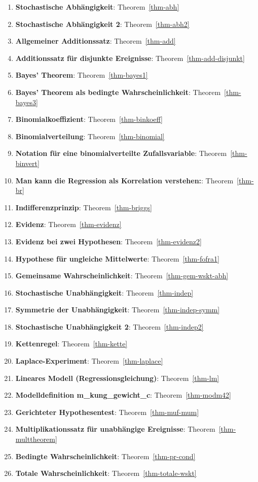 \documentclass[
  ngerman,
  letterpaper,
  twoside,
  open=any]{scrbook}
\theoremstyle{definition}
\theoremstyle{plain}
\theoremstyle{definition}
\theoremstyle{definition}
\theoremstyle{definition}
\theoremstyle{definition}
\theoremstyle{remark}
\begin{document}
\begin{enumerate}
\def\labelenumi{\arabic{enumi}.}
\item
  \textbf{Stochastische Abhängigkeit}: Theorem~\ref{thm-abh}
\item
  \textbf{Stochastische Abhängigkeit 2}: Theorem~\ref{thm-abh2}
\item
  \textbf{Allgemeiner Additionssatz}: Theorem~\ref{thm-add}
\item
  \textbf{Additionssatz für disjunkte Ereignisse}:
  Theorem~\ref{thm-add-disjunkt}
\item
  \textbf{Bayes' Theorem}: Theorem~\ref{thm-bayes1}
\item
  \textbf{Bayes' Theorem als bedingte Wahrscheinlichkeit}:
  Theorem~\ref{thm-bayes3}
\item
  \textbf{Binomialkoeffizient}: Theorem~\ref{thm-binkoeff}
\item
  \textbf{Binomialverteilung}: Theorem~\ref{thm-binomial}
\item
  \textbf{Notation für eine binomialverteilte Zufallsvariable}:
  Theorem~\ref{thm-binvert}
\item
  \textbf{Man kann die Regression als Korrelation verstehen:}:
  Theorem~\ref{thm-br}
\item
  \textbf{Indifferenzprinzip}: Theorem~\ref{thm-briggs}
\item
  \textbf{Evidenz}: Theorem~\ref{thm-evidenz}
\item
  \textbf{Evidenz bei zwei Hypothesen}: Theorem~\ref{thm-evidenz2}
\item
  \textbf{Hypothese für ungleiche Mittelwerte}: Theorem~\ref{thm-fofra1}
\item
  \textbf{Gemeinsame Wahrscheinlichkeit}: Theorem~\ref{thm-gem-wskt-abh}
\item
  \textbf{Stochastische Unabhängigkeit}: Theorem~\ref{thm-indep}
\item
  \textbf{Symmetrie der Unabhängigkeit}: Theorem~\ref{thm-indep-symm}
\item
  \textbf{Stochastische Unabhängigkeit 2}: Theorem~\ref{thm-indep2}
\item
  \textbf{Kettenregel}: Theorem~\ref{thm-kette}
\item
  \textbf{Laplace-Experiment}: Theorem~\ref{thm-laplace}
\item
  \textbf{Lineares Modell (Regressionsgleichung)}: Theorem~\ref{thm-lm}
\item
  \textbf{Modelldefinition m\_kung\_gewicht\_c}:
  Theorem~\ref{thm-modm42}
\item
  \textbf{Gerichteter Hypothesentest}: Theorem~\ref{thm-muf-mum}
\item
  \textbf{Multiplikationssatz für unabhängige Ereignisse}:
  Theorem~\ref{thm-multtheorem}
\item
  \textbf{Bedingte Wahrscheinlichkeit}: Theorem~\ref{thm-pr-cond}
\item
  \textbf{Totale Wahrscheinlichkeit}: Theorem~\ref{thm-totale-wskt}
\end{enumerate}


\backmatter
\end{document}
